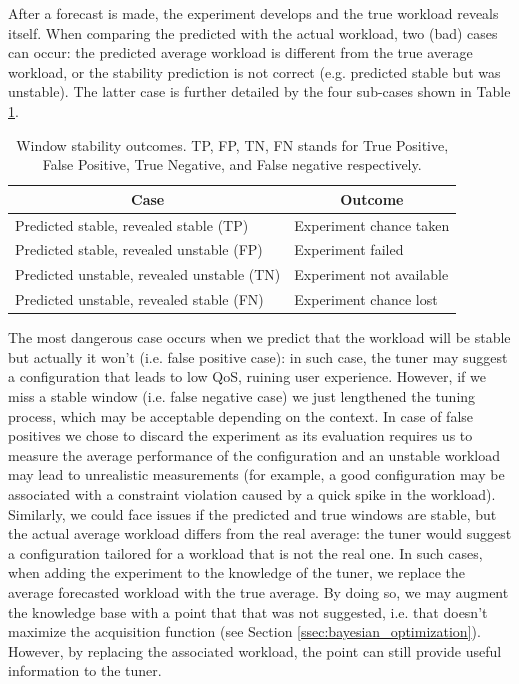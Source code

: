 \documentclass[a4paper, 12pt]{article} %
\newcommand{\ra}[1]{\renewcommand{\arraystretch}{#1}}
\begin{document}
	 After a forecast is made, the experiment develops and the true workload reveals itself. When comparing the predicted with the actual workload, two (bad) cases can occur: the predicted average workload is different from the true average workload, or the stability prediction is not correct (e.g. predicted stable but was unstable). The latter case is further detailed by the four sub-cases shown in Table \ref{table:stability_cases}. 	 
     \begin{table}
	 	\ra{1.3}
	 	\begin{tabular*}{\textwidth}{l l}
	 		\toprule
	 		\multicolumn{1}{c}{Case} & \multicolumn{1}{c}{Outcome}\\
	 		\midrule
	 		Predicted stable, revealed stable (TP) & Experiment chance taken\\
	 		Predicted stable, revealed unstable (FP)& Experiment failed\\
	 		Predicted unstable, revealed unstable (TN)& Experiment not available\\
	 		Predicted unstable, revealed stable (FN)& Experiment chance lost\\
	 		\bottomrule
	 	\end{tabular*}
	 	\caption{Window stability outcomes. TP, FP, TN, FN stands for True Positive, False Positive, True Negative, and False negative respectively.} \label{table:stability_cases}
	 \end{table}
	 The most dangerous case occurs when we predict that the workload will be stable but actually it won't (i.e. false positive case): in such case, the tuner may suggest a configuration that leads to low QoS, ruining user experience. However, if we miss a stable window (i.e. false negative case) we just lengthened the tuning process, which may be acceptable depending on the context.
	 In case of false positives we chose to discard the experiment as its evaluation requires us to measure the average performance of the configuration and an unstable workload may lead to unrealistic measurements (for example, a good configuration may be associated with a constraint violation caused by a quick spike in the workload).\\
	 Similarly, we could face issues if the predicted and true windows are stable, but the actual average workload differs from the real average: the tuner would suggest a configuration tailored for a workload that is not the real one. In such cases, when adding the experiment to the knowledge of the tuner, we replace the average forecasted workload with the true average. By doing so, we may augment the knowledge base with a point that that was not suggested, i.e. that doesn't maximize the acquisition function (see Section \ref{ssec:bayesian_optimization}). However, by replacing the associated workload, the point can still provide useful information to the tuner.
	 
\end{document}
